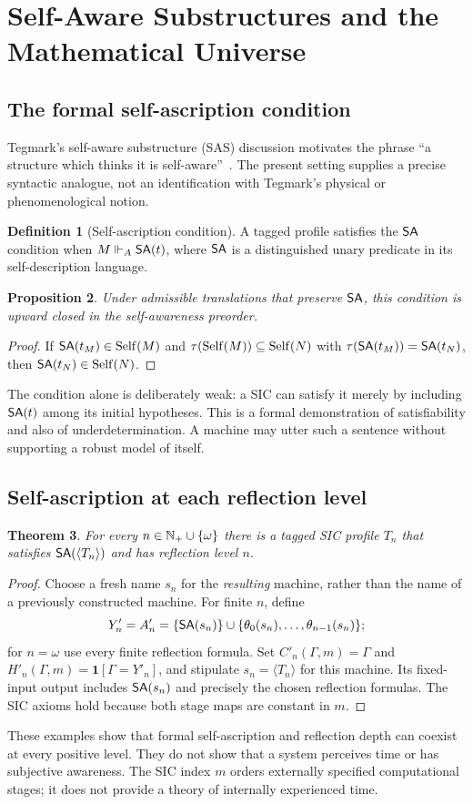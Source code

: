 \documentclass[11pt,letterpaper]{article}
\newtheorem{theorem}{Theorem}[section]\newtheorem{proposition}[theorem]{Proposition}\newtheorem{lemma}[theorem]{Lemma}\newtheorem{corollary}[theorem]{Corollary}\newtheorem{conjecture}[theorem]{Conjecture}\theoremstyle{definition}\newtheorem{definition}[theorem]{Definition}\newtheorem{example}[theorem]{Example}\newtheorem{remark}[theorem]{Remark}
\begin{document}
\section{Self-Aware Substructures and the Mathematical Universe}
\subsection{The formal self-ascription condition}
Tegmark's self-aware substructure (SAS) discussion motivates the phrase ``a structure which thinks it is self-aware''~\cite{tegmark1998,tegmark2008}. The present setting supplies a precise syntactic analogue, not an identification with Tegmark's physical or phenomenological notion.
\begin{definition}[Self-ascription condition]
A tagged profile satisfies the $\mathsf{SA}$ condition when $M\Vdash_A\mathsf{SA}(t)$, where $\mathsf{SA}$ is a distinguished unary predicate in its self-description language.
\end{definition}
\begin{proposition}
Under admissible translations that preserve $\mathsf{SA}$, this condition is upward closed in the self-awareness preorder.
\end{proposition}
\begin{proof}
If $\mathsf{SA}(t_M)\in\operatorname{Self}(M)$ and $\tau(\operatorname{Self}(M))\subseteq\operatorname{Self}(N)$ with $\tau(\mathsf{SA}(t_M))=\mathsf{SA}(t_N)$, then $\mathsf{SA}(t_N)\in\operatorname{Self}(N)$.
\end{proof}
The condition alone is deliberately weak: a SIC can satisfy it merely by including $\mathsf{SA}(t)$ among its initial hypotheses. This is a formal demonstration of satisfiability and also of underdetermination. A machine may utter such a sentence without supporting a robust model of itself.

\subsection{Self-ascription at each reflection level}
\begin{theorem}
For every $n\in\mathbb N_{+}\cup\{\omega\}$ there is a tagged SIC profile $T_n$ that satisfies $\mathsf{SA}(\langle T_n\rangle)$ and has reflection level $n$.
\end{theorem}
\begin{proof}
Choose a fresh name $s_n$ for the \emph{resulting} machine, rather than the name of a previously constructed machine. For finite $n$, define
\[
Y'_n=A'_n=\{\mathsf{SA}(s_n)\}\cup\{\theta_0(s_n),\dots,\theta_{n-1}(s_n)\};
\]
for $n=\omega$ use every finite reflection formula. Set $C'_n(\Gamma,m)=\Gamma$ and $H'_n(\Gamma,m)=\mathbf1[\Gamma=Y'_n]$, and stipulate $s_n=\langle T_n\rangle$ for this machine. Its fixed-input output includes $\mathsf{SA}(s_n)$ and precisely the chosen reflection formulas. The SIC axioms hold because both stage maps are constant in $m$.
\end{proof}
These examples show that formal self-ascription and reflection depth can coexist at every positive level. They do not show that a system perceives time or has subjective awareness. The SIC index $m$ orders externally specified computational stages; it does not provide a theory of internally experienced time.
\end{document}
